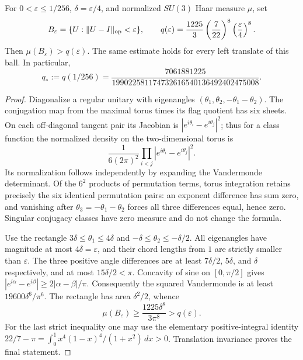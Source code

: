 \documentclass[12pt,a4paper]{article}
\begin{document}
\begin{lemma}
\label{p10:lem:next187-su3-haar-ball}
For $0<\varepsilon\le1/256$, $\delta=\varepsilon/4$, and normalized
$SU(3)$ Haar measure $\mu$, set
\[
 B_\varepsilon=\{U:\|U-I\|_{\rm op}<\varepsilon\},\qquad
 q(\varepsilon)=\frac{1225}{3}\left(\frac7{22}\right)^8
                   \left(\frac\varepsilon4\right)^8.
\]
Then $\mu(B_\varepsilon)>q(\varepsilon)$. The same estimate holds for every
left translate of this ball. In particular,
\[
 q_*:=q(1/256)
 =\frac{7061881225}{199022581174732616540136492402475008}.
\]
\end{lemma}
\begin{proof}
Diagonalize a regular unitary with eigenangles
$(\theta_1,\theta_2,-\theta_1-\theta_2)$. The conjugation map from the maximal
torus times its flag quotient has six sheets. On each off-diagonal tangent
pair its Jacobian is $|e^{i\theta_i}-e^{i\theta_j}|^2$; thus for a class
function the normalized density on the two-dimensional torus is
\[
 \frac1{6(2\pi)^2}\prod_{i<j}|e^{i\theta_i}-e^{i\theta_j}|^2.
\]
Its normalization follows independently by expanding the Vandermonde
determinant. Of the $6^2$ products of permutation terms, torus integration
retains precisely the six identical permutation pairs: an exponent difference
has sum zero, and vanishing after $\theta_3=-\theta_1-\theta_2$ forces all
three differences equal, hence zero. Singular conjugacy classes have zero
measure and do not change the formula.

Use the rectangle $3\delta\le\theta_1\le4\delta$ and
$-\delta\le\theta_2\le-\delta/2$. All eigenangles have magnitude at most
$4\delta=\varepsilon$, and their chord lengths from $1$ are strictly smaller
than $\varepsilon$. The three positive angle differences are at least
$7\delta/2$, $5\delta$, and $\delta$ respectively, and at most
$15\delta/2<\pi$. Concavity of sine on $[0,\pi/2]$ gives
$|e^{i\alpha}-e^{i\beta}|\ge2|\alpha-\beta|/\pi$. Consequently the squared
Vandermonde is at least $19600\delta^6/\pi^6$. The rectangle has area
$\delta^2/2$, whence
\[
 \mu(B_\varepsilon)\ge\frac{1225\delta^8}{3\pi^8}>q(\varepsilon).
\]
For the last strict inequality one may use the elementary positive-integral
identity $22/7-\pi=\int_0^1 x^4(1-x)^4/(1+x^2)\,dx>0$.
Translation invariance proves the final statement.
\end{proof}
\end{document}
